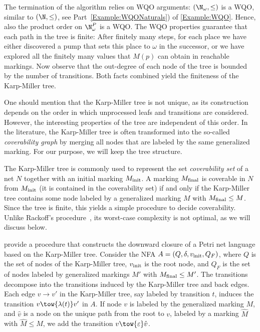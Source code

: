 \documentclass[../../diss.tex]{subfiles}
\begin{document}
The termination of the algorithm relies on WQO arguments:
$(\N_\omega,\leq)$ is a WQO, similar to $(\N,\leq)$, see Part~\ref{Example:WQONaturals}) of \cref{Example:WQO}.
Hence, also the product order on $\N_\omega^P$ is a WQO.\@
The WQO properties guarantee that each path in the tree is finite:
After finitely many steps, for each place we have either discovered a pump that sets this place to $\omega$ in the successor, or we have explored all the finitely many values that $M(p)$ can obtain in reachable markings.
Now observe that the out-degree of each node of the tree is bounded by the number of transitions.
Both facts combined yield the finiteness of the Karp-Miller tree.

One should mention that the Karp-Miller tree is not unique, as its construction depends on the order in which unprocessed leafs and transitions are considered.
However, the interesting properties of the tree are independent of this order.
In the literature, the Karp-Miller tree is often transformed into the so-called \emph{coverability graph} by merging all nodes that are labeled by the same generalized marking.
For our purpose, we will keep the tree structure.

The Karp-Miller tree is commonly used to represent the set \emph{coverability set} of a net $N$ together with an initial marking $M_{\text{init}}$.
A marking $M_{\text{final}}$ is coverable in $N$ from $M_{\text{init}}$ (\ie it is contained in the coverability set) if and only if the Karp-Miller tree contains some node labeled by a generalized marking $M$ with $M_{\text{final}} \leq M$.
Since the tree is finite, this yields a simple procedure to decide coverability.
Unlike Rackoff's procedure~\cite{Rackoff78}, its worst-case complexity is not optimal, as we will discuss below.

 provide a procedure that constructs the downward closure of a Petri net language based on the Karp-Miller tree.
Consider the NFA $A = (Q, \delta, v_{\text{init}}, Q_F)$, where $Q$ is the set of nodes of the Karp-Miller tree, $v_{\text{init}}$ is the root node, and $Q_F$ is the set of nodes labeled by generalized markings $M'$ with $M_{\text{final}} \leq M'$.
The transitions decompose into the transitions induced by the Karp-Miller tree and back edges.
Each edge $v \to v'$ in the Karp-Miller tree, say labeled by transition $t$, induces the transition $v \tow{\lambda(t)} v'$ in $A$.
If node $v$ is labeled by the generalized marking $M$, and $\hat{v}$ is a node on the unique path from the root to $v$, labeled by a marking $\hat{M}$ with $\hat{M} \leq M$, we add the transition $v \tow{\eps} \hat{v}$.
\end{document}
